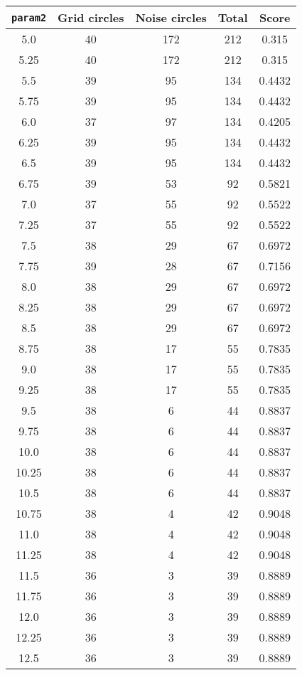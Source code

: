 \documentclass[letterpaper, 12pt]{article}
\begin{document}
\begin{longtable}{|c|c|c|c|c|}
\hline
\textbf{\texttt{param2}} & \textbf{Grid circles} & \textbf{Noise circles} & \textbf{Total} & \textbf{Score} \\
\hline
5.0 & 40 & 172 & 212 & 0.315 \\
\hline
5.25 & 40 & 172 & 212 & 0.315 \\
\hline
5.5 & 39 & 95 & 134 & 0.4432 \\
\hline
5.75 & 39 & 95 & 134 & 0.4432 \\
\hline
6.0 & 37 & 97 & 134 & 0.4205 \\
\hline
6.25 & 39 & 95 & 134 & 0.4432 \\
\hline
6.5 & 39 & 95 & 134 & 0.4432 \\
\hline
6.75 & 39 & 53 & 92 & 0.5821 \\
\hline
7.0 & 37 & 55 & 92 & 0.5522 \\
\hline
7.25 & 37 & 55 & 92 & 0.5522 \\
\hline
7.5 & 38 & 29 & 67 & 0.6972 \\
\hline
7.75 & 39 & 28 & 67 & 0.7156 \\
\hline
8.0 & 38 & 29 & 67 & 0.6972 \\
\hline
8.25 & 38 & 29 & 67 & 0.6972 \\
\hline
8.5 & 38 & 29 & 67 & 0.6972 \\
\hline
8.75 & 38 & 17 & 55 & 0.7835 \\
\hline
9.0 & 38 & 17 & 55 & 0.7835 \\
\hline
9.25 & 38 & 17 & 55 & 0.7835 \\
\hline
9.5 & 38 & 6 & 44 & 0.8837 \\
\hline
9.75 & 38 & 6 & 44 & 0.8837 \\
\hline
10.0 & 38 & 6 & 44 & 0.8837 \\
\hline
10.25 & 38 & 6 & 44 & 0.8837 \\
\hline
10.5 & 38 & 6 & 44 & 0.8837 \\
\hline
10.75 & 38 & 4 & 42 & 0.9048 \\
\hline
11.0 & 38 & 4 & 42 & 0.9048 \\
\hline
11.25 & 38 & 4 & 42 & 0.9048 \\
\hline
11.5 & 36 & 3 & 39 & 0.8889 \\
\hline
11.75 & 36 & 3 & 39 & 0.8889 \\
\hline
12.0 & 36 & 3 & 39 & 0.8889 \\
\hline
12.25 & 36 & 3 & 39 & 0.8889 \\
\hline
12.5 & 36 & 3 & 39 & 0.8889 \\

\end{longtable}
\end{document}
